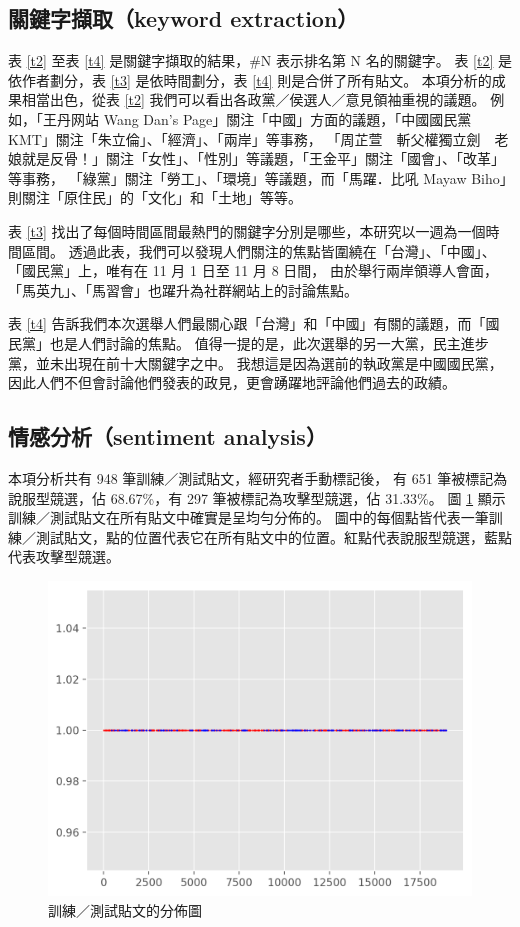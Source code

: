 \documentclass[a4paper, 10pt, conference]{ieeeconf}       %
\begin{document}
\begin{CJK}{UTF8}{bsmi}
\twocolumn

\subsection*{關鍵字擷取（keyword extraction）}

表 \ref{t2} 至表 \ref{t4} 是關鍵字擷取的結果，\#N 表示排名第 N 名的關鍵字。%
表 \ref{t2} 是依作者劃分，表 \ref{t3} 是依時間劃分，表 \ref{t4} 則是合併了所有貼文。%
本項分析的成果相當出色，從表 \ref{t2} 我們可以看出各政黨／侯選人／意見領袖重視的議題。%
例如，「王丹网站 Wang Dan's Page」關注「中國」方面的議題，「中國國民黨 KMT」關注「朱立倫」、「經濟」、「兩岸」等事務，%
「周芷萱　斬父權獨立劍　老娘就是反骨！」關注「女性」、「性別」等議題，「王金平」關注「國會」、「改革」等事務，%
「綠黨」關注「勞工」、「環境」等議題，而「馬躍．比吼 Mayaw Biho」則關注「原住民」的「文化」和「土地」等等。%

表 \ref{t3} 找出了每個時間區間最熱門的關鍵字分別是哪些，本研究以一週為一個時間區間。%
透過此表，我們可以發現人們關注的焦點皆圍繞在「台灣」、「中國」、「國民黨」上，唯有在 11 月 1 日至 11 月 8 日間，%
由於舉行兩岸領導人會面，「馬英九」、「馬習會」也躍升為社群網站上的討論焦點。%

表 \ref{t4} 告訴我們本次選舉人們最關心跟「台灣」和「中國」有關的議題，而「國民黨」也是人們討論的焦點。%
值得一提的是，此次選舉的另一大黨，民主進步黨，並未出現在前十大關鍵字之中。%
我想這是因為選前的執政黨是中國國民黨，因此人們不但會討論他們發表的政見，更會踴躍地評論他們過去的政績。%

\subsection*{情感分析（sentiment analysis）}

本項分析共有 948 筆訓練／測試貼文，經研究者手動標記後，%
有 651 筆被標記為說服型競選，佔 68.67\%，有 297 筆被標記為攻擊型競選，佔 31.33\%。%
圖 \ref{f3} 顯示訓練／測試貼文在所有貼文中確實是呈均勻分佈的。%
圖中的每個點皆代表一筆訓練／測試貼文，點的位置代表它在所有貼文中的位置。紅點代表說服型競選，藍點代表攻擊型競選。%

\begin{figure}[!htbp]
\centering
\includegraphics[width=\columnwidth]{meta}
\caption{訓練／測試貼文的分佈圖}
\label{f3}
\end{figure}


\end{CJK}
\end{document}
